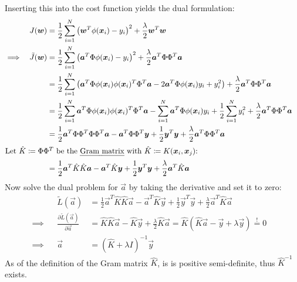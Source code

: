 			Inserting this into the cost function yields the dual formulation:
			\begin{align}
				         &  & J(\vec{w})         & = \frac{1}{2} \sum_{i = 1}^{N} \big( \vec{w}^T \phi(\vec{x}_i) - y_i \big)^2 + \frac{\lambda}{2} \vec{w}^T \vec{w}                                                                                                                         & \\
				\implies &  & \tilde{J}(\vec{w}) & = \frac{1}{2} \sum_{i = 1}^{N} \big( \vec{a}^T \Phi \phi(\vec{x}_i) - y_i \big)^2 + \frac{\lambda}{2} \vec{a}^T \Phi \Phi^T \vec{a}                                                                                                        & \\
				         &  &                    & = \frac{1}{2} \sum_{i = 1}^{N} \big( \vec{a}^T \Phi \phi(\vec{x}_i) \phi(\vec{x}_i)^T \Phi^T \vec{a} - 2 \vec{a}^T \Phi \phi(\vec{x}_i)y_i + y_i^2 \big) + \frac{\lambda}{2} \vec{a}^T \Phi \Phi^T \vec{a}                                 & \\
				         &  &                    & = \frac{1}{2} \sum_{i = 1}^{N} \vec{a}^T \Phi \phi(\vec{x}_i) \phi(\vec{x}_i)^T \Phi^T \vec{a} - \sum_{i = 1}^{N} \vec{a}^T \Phi \phi(\vec{x}_i)y_i + \frac{1}{2} \sum_{i = 1}^{N} y_i^2 + \frac{\lambda}{2} \vec{a}^T \Phi \Phi^T \vec{a} & \\
				         &  &                    & = \frac{1}{2} \vec{a}^T \Phi \Phi^T \Phi \Phi^T \vec{a} - \vec{a}^T \Phi \Phi^T \vec{y} + \frac{1}{2} \vec{y}^T \vec{y} + \frac{\lambda}{2} \vec{a}^T \Phi \Phi^T \vec{a}                                                                  & \\
				\intertext{Let \( \hat{K} \coloneqq \Phi\Phi^T \) be the \emph{Gram matrix} with \( \hat{K} \coloneqq K(\vec{x}_i, \vec{x}_j) \):}
				         &  &                    & = \frac{1}{2} \vec{a}^T \hat{K} \hat{K} \vec{a} - \vec{a}^T \hat{K} \vec{y} + \frac{1}{2} \vec{y}^T \vec{y} + \frac{\lambda}{2} \vec{a}^T \hat{K} \vec{a}                                                                                  & \\
			\end{align}
			Now solve the dual problem for \(\vec{a}\) by taking the derivative and set it to zero:
			\begin{align}
				         &  & \tilde{L}(\vec{a})                                   & = \frac{1}{2} \vec{a}^T \hat{K} \hat{K} \vec{a} - \vec{a}^T \hat{K} \vec{y} + \frac{1}{2} \vec{y}^T \vec{y} + \frac{\lambda}{2} \vec{a}^T \hat{K} \vec{a} & \\
				\implies &  & \frac{\partial \tilde{L}(\vec{a})}{\partial \vec{a}} & = \hat{K} \hat{K} \vec{a} - \hat{K} \vec{y} + \frac{\lambda}{2} \hat{K} \vec{a} = \hat{K} (\hat{K}\vec{a} - \vec{y} + \lambda\vec{y}) \overset{!}{=} 0    & \\
				\implies &  & \vec{a}                                              & = (\hat{K} + \lambda I)^{-1} \vec{y}
			\end{align}
			As of the definition of the Gram matrix \(\hat{K}\), is is positive semi-definite, thus \(\hat{K}^{-1}\) exists.

